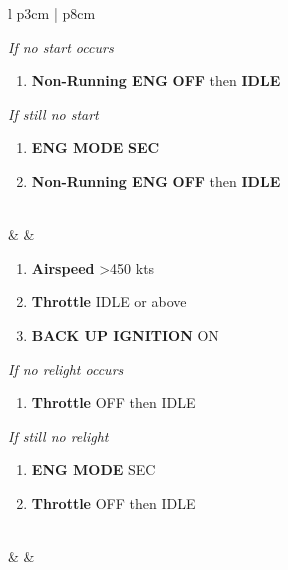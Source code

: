\documentclass[fontHelvetica]{TechCheck}
\begin{document}
\begin{center}
\begin{longtable}{l p{3cm} | p{8cm}}
\begin{minipage}[t]{\linewidth}
\begin{enumerate}
				\end{enumerate}
				\emph{If no start occurs}
				\begin{enumerate}[resume]
					\vspace{-7pt}
					\item \textbf{Non-Running ENG} \dotfill \textbf{OFF} then \textbf{IDLE}
				\end{enumerate}
				\emph{If still no start}
				\begin{enumerate}[resume]
					\vspace{-7pt}
					\item \textbf{ENG MODE} \dotfill \textbf{SEC}
					\item \textbf{Non-Running ENG} \dotfill \textbf{OFF} then \textbf{IDLE}
				\end{enumerate}
			\end{minipage} \\
			\midrule
			\textbf{\textbf{\textbullet}} &  &
			\begin{minipage}[t]{\linewidth}
				\vspace{-7pt}
				\begin{enumerate}
					\item \textbf{Airspeed} \dotfill >450 kts
					\item \textbf{Throttle} \dotfill IDLE or above
					\item \textbf{BACK UP IGNITION} \dotfill ON
				\end{enumerate}
				\emph{If no relight occurs}
				\begin{enumerate}[resume]
					\vspace{-7pt}
					\item \textbf{Throttle} \dotfill OFF then IDLE
				\end{enumerate}
				\emph{If still no relight}
				\begin{enumerate}[resume]
					\vspace{-7pt}
					\item \textbf{ENG MODE} \dotfill SEC
					\item \textbf{Throttle} \dotfill OFF then IDLE
				\end{enumerate}
			\end{minipage} \\
			\midrule
			\textbf{\textbf{\textbullet}} &  &

\end{longtable}
\end{center}
\end{document}
